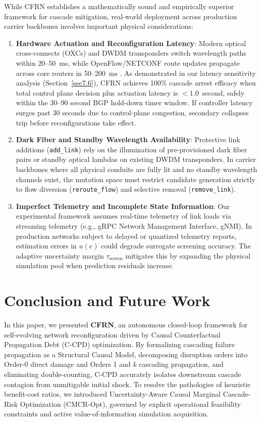 \documentclass[pdflatex,sn-mathphys-num]{sn-jnl}
\theoremstyle{thmstyleone}
\theoremstyle{thmstyletwo}
\theoremstyle{thmstylethree}
\begin{document}
While CFRN establishes a mathematically sound and empirically superior framework for cascade mitigation, real-world deployment across production carrier backbones involves important physical considerations:
\begin{enumerate}
    \item \textbf{Hardware Actuation and Reconfiguration Latency}: Modern optical cross-connects (OXCs) and DWDM transponders switch wavelength paths within 20--50~ms, while OpenFlow/NETCONF route updates propagate across core routers in 50--200~ms \cite{mckeown2008openflow,hong2013achieving}. As demonstrated in our latency sensitivity analysis (Section~\ref{sec7.6}), CFRN achieves 100\% cascade arrest efficacy when total control plane decision plus actuation latency is $<1.0$~second, safely within the 30--90 second BGP hold-down timer window. If controller latency surges past 30 seconds due to control-plane congestion, secondary collapses trip before reconfigurations take effect.
    \item \textbf{Dark Fiber and Standby Wavelength Availability}: Protective link additions (\texttt{add\_link}) rely on the illumination of pre-provisioned dark fiber pairs or standby optical lambdas on existing DWDM transponders. In carrier backbones where all physical conduits are fully lit and no standby wavelength channels exist, the mutation space must restrict candidate generation strictly to flow diversion (\texttt{reroute\_flow}) and selective removal (\texttt{remove\_link}).
    \item \textbf{Imperfect Telemetry and Incomplete State Information}: Our experimental framework assumes real-time telemetry of link loads via streaming telemetry (e.g., gRPC Network Management Interface, gNMI). In production networks subject to delayed or quantized telemetry reports, estimation errors in $u(e)$ could degrade surrogate screening accuracy. The adaptive uncertainty margin $\tau_{\mathrm{screen}}$ mitigates this by expanding the physical simulation pool when prediction residuals increase.
\end{enumerate}

\section{Conclusion and Future Work}\label{sec9}

In this paper, we presented \textbf{CFRN}, an autonomous closed-loop framework for self-evolving network reconfiguration driven by Causal Counterfactual Propagation Debt (C-CPD) optimization. By formalizing cascading failure propagation as a Structural Causal Model, decomposing disruption orders into Order-0 direct damage and Orders 1 and $k$ cascading propagation, and eliminating double-counting, C-CPD accurately isolates downstream cascade contagion from unmitigable initial shock. To resolve the pathologies of heuristic benefit-cost ratios, we introduced Uncertainty-Aware Causal Marginal Cascade-Risk Optimization (CMCR-Opt), governed by explicit operational feasibility constraints and active value-of-information simulation acquisition. 
\end{document}
